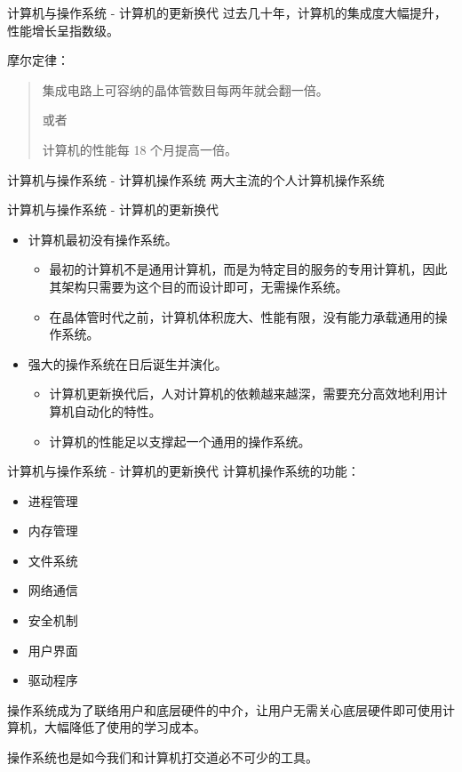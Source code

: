 \documentclass[UTF8]{ctexbeamer}
\begin{document}
\begin{frame}{计算机与操作系统 - 计算机的更新换代}
    过去几十年，计算机的集成度大幅提升，性能增长呈指数级。
    
    \vspace{1em}
    
    摩尔定律：
    \vspace{0.5em}
    \begin{quote}
    集成电路上可容纳的晶体管数目每两年就会翻一倍。
    
    或者
    
    计算机的性能每 18 个月提高一倍。
    \end{quote}
\end{frame}
\begin{frame}{计算机与操作系统 - 计算机操作系统}
    两大主流的个人计算机操作系统
\end{frame}
\begin{frame}{计算机与操作系统 - 计算机的更新换代}
    
    \begin{itemize}
        \item 计算机最初没有操作系统。
        \begin{itemize}
            \item 最初的计算机不是通用计算机，而是为特定目的服务的专用计算机，因此其架构只需要为这个目的而设计即可，无需操作系统。
            \item 在晶体管时代之前，计算机体积庞大、性能有限，没有能力承载通用的操作系统。
        \end{itemize}
        \item 强大的操作系统在日后诞生并演化。
        \begin{itemize}
            \item 计算机更新换代后，人对计算机的依赖越来越深，需要充分高效地利用计算机自动化的特性。
            \item 计算机的性能足以支撑起一个通用的操作系统。
        \end{itemize}
    \end{itemize}
\end{frame}
\begin{frame}{计算机与操作系统 - 计算机的更新换代}
    计算机操作系统的功能：
    
    \begin{itemize}
        \item 进程管理
        \item 内存管理
        \item 文件系统
        \item 网络通信
        \item 安全机制
        \item 用户界面
        \item 驱动程序
    \end{itemize}
    \vspace{1em}
    操作系统成为了联络用户和底层硬件的中介，让用户无需关心底层硬件即可使用计算机，大幅降低了使用的学习成本。

    操作系统也是如今我们和计算机打交道必不可少的工具。
\end{frame}
\end{document}
